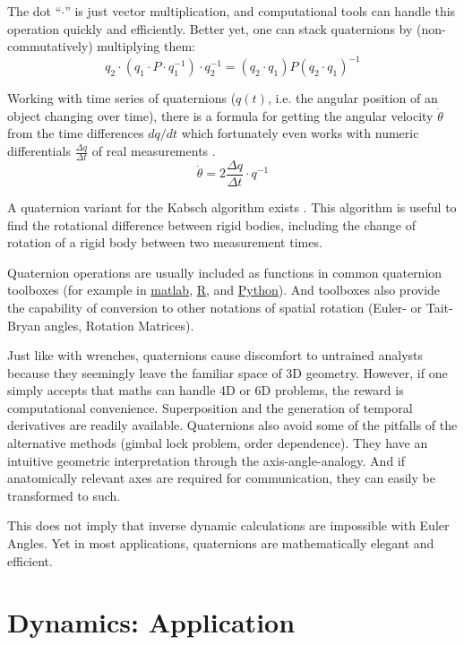 The dot ``\(\cdot\)'' is just vector multiplication, and computational tools can handle this operation quickly and efficiently.
Better yet, one can stack quaternions by (non-commutatively) multiplying them:
\[ q_2 \cdot \left( q_1\cdot P\cdot q_1^{-1}\right) \cdot q_2^{-1} = (q_2\cdot q_1) P (q_2\cdot q_1)^{-1} \]

Working with time series of quaternions (\(q(t)\), i.e. the angular position of an object changing over time), there is a formula for getting the angular velocity \(\dot \theta\) from the time differences \(dq/dt\) which fortunately even works with numeric differentials \(\frac{\Delta q}{\Delta t}\) of real measurements \citep{Baker1999}.
\[\dot \theta = 2 \frac{\Delta q}{\Delta t} \cdot q^{-1} \]

A quaternion variant for the Kabsch algorithm exists \citep{Kabsch1976,Lawrence2019,Kneller1991}.
This algorithm is useful to find the rotational difference between rigid bodies, including the change of rotation of a rigid body between two measurement times.


Quaternion operations are usually included as functions in common quaternion toolboxes (for example in \href{https://www.mathworks.com/discovery/quaternion.html}{matlab}, \href{https://cran.r-project.org/web/packages/onion/onion.pdf}{R}, and \href{https://pypi.org/project/numpy-quaternion}{Python}).
And toolboxes also provide the capability of conversion to other notations of spatial rotation (Euler- or Tait-Bryan angles, Rotation Matrices).


Just like with wrenches, quaternions cause discomfort to untrained analysts because they seemingly leave the familiar space of 3D geometry.
However, if one simply accepts that maths can handle 4D or 6D problems, the reward is computational convenience.
Superposition and the generation of temporal derivatives are readily available.
Quaternions also avoid some of the pitfalls of the alternative methods (gimbal lock problem, order dependence).
They have an intuitive geometric interpretation through the axis-angle-analogy.
And if anatomically relevant axes are required for communication, they can easily be transformed to such.

This does not imply that inverse dynamic calculations are impossible with Euler Angles.
Yet in most applications, quaternions are mathematically elegant and efficient.


\section{Dynamics: Application}
\label{sec:orga7d7f74}

